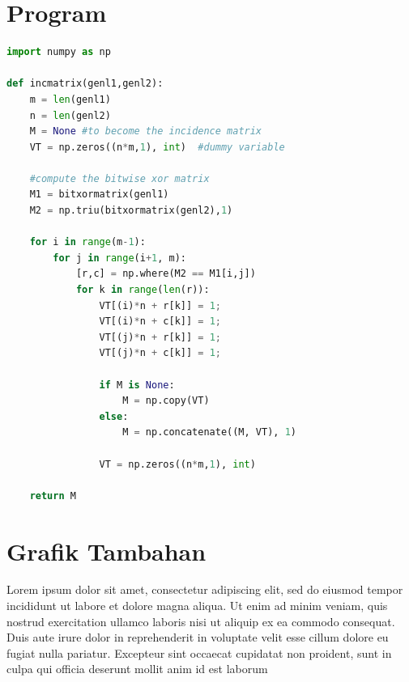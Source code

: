 \chapter{Program} \label{lam:lampiran_a}
\begin{lstlisting}[language=Python]
import numpy as np

def incmatrix(genl1,genl2):
    m = len(genl1)
    n = len(genl2)
    M = None #to become the incidence matrix
    VT = np.zeros((n*m,1), int)  #dummy variable

    #compute the bitwise xor matrix
    M1 = bitxormatrix(genl1)
    M2 = np.triu(bitxormatrix(genl2),1)

    for i in range(m-1):
        for j in range(i+1, m):
            [r,c] = np.where(M2 == M1[i,j])
            for k in range(len(r)):
                VT[(i)*n + r[k]] = 1;
                VT[(i)*n + c[k]] = 1;
                VT[(j)*n + r[k]] = 1;
                VT[(j)*n + c[k]] = 1;

                if M is None:
                    M = np.copy(VT)
                else:
                    M = np.concatenate((M, VT), 1)

                VT = np.zeros((n*m,1), int)

    return M
\end{lstlisting}

\chapter{Grafik Tambahan} \label{lampiran B}
 Lorem ipsum dolor sit amet, consectetur adipiscing elit, sed do eiusmod tempor incididunt ut labore et dolore magna aliqua. Ut enim ad minim veniam, quis nostrud exercitation ullamco laboris nisi ut aliquip ex ea commodo consequat. Duis aute irure dolor in reprehenderit in voluptate velit esse cillum dolore eu fugiat nulla pariatur. Excepteur sint occaecat cupidatat non proident, sunt in culpa qui officia deserunt mollit anim id est laborum
